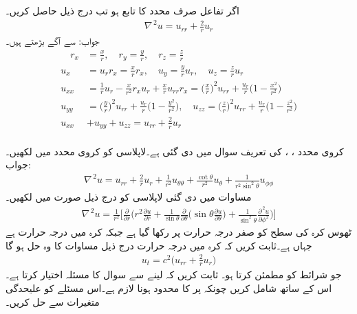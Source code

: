 اگر تفاعل  صرف محدد  کا تابع ہو تب درج ذیل حاصل کریں۔
\begin{align*}
\nabla^{\,2}u=u_{rr}+\frac{2}{r}u_r
\end{align*}
جواب:\quad {} سے آگے بڑھتے ہیں۔
\begin{align*}
\quad r_x&=\frac{x}{r}, \quad r_y=\frac{y}{r},\quad r_z=\frac{z}{r}\\
u_x&=u_r r_x=\frac{x}{r}r_x,\quad u_y=\frac{y}{r}u_r,\quad u_z=\frac{z}{r}u_r\\
u_{xx}&=\frac{1}{r}u_r-\frac{x}{r^2}r_xu_r+\frac{x}{r}u_{rr}r_x=\big(\frac{x}{r}\big)^2u_{rr}+\frac{u_r}{r}\big(1-\frac{x^2}{r^2}\big)\\
u_{yy}&=\big(\frac{y}{r}\big)^2u_{rr}+\frac{u_r}{r}\big(1-\frac{y^2}{r^2}\big),\quad u_{zz}=\big(\frac{z}{r}\big)^2u_{rr}+\frac{u_r}{r}\big(1-\frac{z^2}{r^2}\big)\\
u_{xx}&+u_{yy}+u_{zz}=u_{rr}+\frac{2}{r}u_r
\end{align*}
\\
کروی محدد ، ،  کی تعریف سوال  میں دی گئی ہے۔لاپلاسی کو کروی محدد میں لکھیں۔\\
جواب:\quad
\begin{align}\label{مساوات_جزوی_کروی_لاپلاسی_الف}
\nabla^{\,2}u=u_{rr}+\frac{2}{r}u_r+\frac{1}{r^2}u_{\theta\theta}+\frac{\cot \theta}{r^2}u_{\theta}+\frac{1}{r^2\sin^2\theta}u_{\phi\phi}
\end{align}
\quad
مساوات  میں دی گئی لاپلاسی کو درج ذیل صورت میں لکھیں۔
\begin{align}\label{مساوات_جزوی_کروی_لاپلاسی_ب}
\nabla^{\,2}u=\frac{1}{r^2}\big[\frac{\partial}{\partial r}\big(r^2\frac{\partial u}{\partial r}+\frac{1}{\sin \theta}\frac{\partial}{\partial \theta}\big(\sin \theta \frac{\partial u}{\partial \theta}\big)+\frac{1}{\sin^2\theta} \frac{\partial^{\,2}u}{\partial \phi^2}\big)\big]
\end{align}
\quad
ٹھوس کرہ  کی سطح کو صفر درجہ حرارت پر رکھا گیا ہے  جبکہ کرہ میں درجہ حرارت  ہے جہاں  ہے۔ثابت کریں کہ کرہ میں درجہ حرارت درج ذیل مساوات کا وہ حل ہو گا
\begin{align*}
u_t=c^2\big(u_{rr}+\frac{2}{r}u_r\big)
\end{align*} 
جو   شرائط کو مطمئن کرتا ہو۔
\quad
ثابت کریں کہ  لینے سے سوال  کا مسئلہ  اختیار کرتا ہے۔اس کے ساتھ  شامل کریں چونکہ  پر  کا محدود ہونا لازم ہے۔اس مسئلے کو علیحدگی متغیرات سے حل کریں۔

